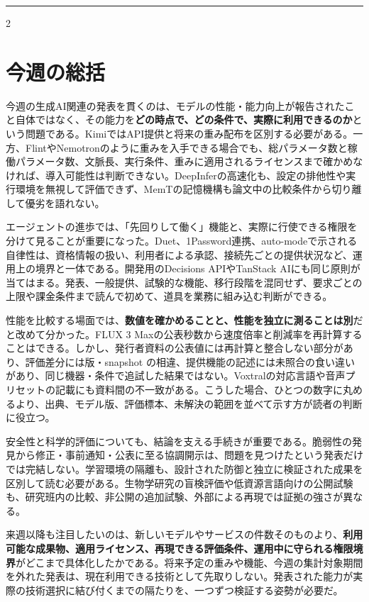 \documentclass[lualatex,a4paper,10pt]{jlreq}
\begin{document}
\bigskip\hrule\bigskip %
\begin{multicols}{2} %


\section*{今週の総括}
\label{sec:recap}
\bigskip


今週の生成AI関連の発表を貫くのは、モデルの性能・能力向上が報告されたこと自体ではなく、その能力を\textbf{どの時点で、どの条件で、実際に利用できるのか}という問題である。KimiではAPI提供と将来の重み配布を区別する必要がある。一方、FlintやNemotronのように重みを入手できる場合でも、総パラメータ数と稼働パラメータ数、文脈長、実行条件、重みに適用されるライセンスまで確かめなければ、導入可能性は判断できない。DeepInferの高速化も、設定の排他性や実行環境を無視して評価できず、MemTの記憶機構も論文中の比較条件から切り離して優劣を語れない。


エージェントの進歩では、「先回りして働く」機能と、実際に行使できる権限を分けて見ることが重要になった。Duet、1Password連携、auto-modeで示される自律性は、資格情報の扱い、利用者による承認、接続先ごとの提供状況など、運用上の境界と一体である。開発用のDecisions APIやTanStack AIにも同じ原則が当てはまる。発表、一般提供、試験的な機能、移行段階を混同せず、要求ごとの上限や課金条件まで読んで初めて、道具を業務に組み込む判断ができる。


性能を比較する場面では、\textbf{数値を確かめることと、性能を独立に測ることは別}だと改めて分かった。FLUX 3 Maxの公表秒数から速度倍率と削減率を再計算することはできる。しかし、発行者資料の公表値には再計算と整合しない部分があり、評価差分には版・snapshot の相違、提供機能の記述には未照合の食い違いがあり、同じ機器・条件で追試した結果ではない。Voxtralの対応言語や音声プリセットの記載にも資料間の不一致がある。こうした場合、ひとつの数字に丸めるより、出典、モデル版、評価標本、未解決の範囲を並べて示す方が読者の判断に役立つ。


安全性と科学的評価についても、結論を支える手続きが重要である。脆弱性の発見から修正・事前通知・公表に至る協調開示は、問題を見つけたという発表だけでは完結しない。学習環境の隔離も、設計された防御と独立に検証された成果を区別して読む必要がある。生物学研究の盲検評価や低資源言語向けの公開試験も、研究班内の比較、非公開の追加試験、外部による再現では証拠の強さが異なる。


来週以降も注目したいのは、新しいモデルやサービスの件数そのものより、\textbf{利用可能な成果物、適用ライセンス、再現できる評価条件、運用中に守られる権限境界}がどこまで具体化したかである。将来予定の重みや機能、今週の集計対象期間を外れた発表は、現在利用できる技術として先取りしない。発表された能力が実際の技術選択に結び付くまでの隔たりを、一つずつ検証する姿勢が必要だ。

\end{multicols} %
\end{document}
